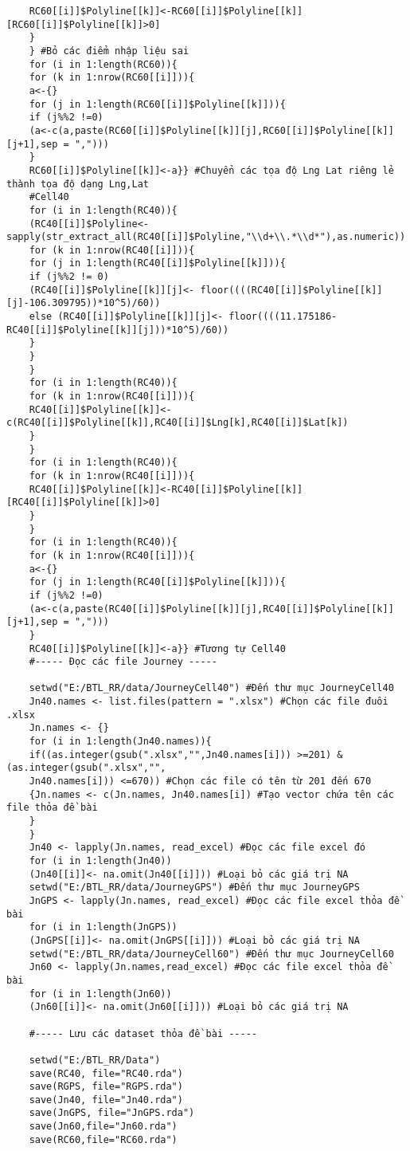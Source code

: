 \documentclass[a4paper]{article}
\begin{document}
\begin{verbatim}
	RC60[[i]]$Polyline[[k]]<-RC60[[i]]$Polyline[[k]][RC60[[i]]$Polyline[[k]]>0]
	}
	} #Bỏ các điểm nhập liệu sai
	for (i in 1:length(RC60)){
	for (k in 1:nrow(RC60[[i]])){
	a<-{}
	for (j in 1:length(RC60[[i]]$Polyline[[k]])){
	if (j%%2 !=0)
	(a<-c(a,paste(RC60[[i]]$Polyline[[k]][j],RC60[[i]]$Polyline[[k]][j+1],sep = ",")))
	}
	RC60[[i]]$Polyline[[k]]<-a}} #Chuyển các tọa độ Lng Lat riêng lẻ thành tọa độ dạng Lng,Lat
	#Cell40
	for (i in 1:length(RC40)){
	(RC40[[i]]$Polyline<-sapply(str_extract_all(RC40[[i]]$Polyline,"\\d+\\.*\\d*"),as.numeric))
	for (k in 1:nrow(RC40[[i]])){
	for (j in 1:length(RC40[[i]]$Polyline[[k]])){
	if (j%%2 != 0)
	(RC40[[i]]$Polyline[[k]][j]<- floor((((RC40[[i]]$Polyline[[k]][j]-106.309795))*10^5)/60))
	else (RC40[[i]]$Polyline[[k]][j]<- floor((((11.175186-RC40[[i]]$Polyline[[k]][j]))*10^5)/60))
	}
	}
	}
	for (i in 1:length(RC40)){
	for (k in 1:nrow(RC40[[i]])){
	RC40[[i]]$Polyline[[k]]<-c(RC40[[i]]$Polyline[[k]],RC40[[i]]$Lng[k],RC40[[i]]$Lat[k])
	}
	}
	for (i in 1:length(RC40)){
	for (k in 1:nrow(RC40[[i]])){
	RC40[[i]]$Polyline[[k]]<-RC40[[i]]$Polyline[[k]][RC40[[i]]$Polyline[[k]]>0]
	}
	}
	for (i in 1:length(RC40)){
	for (k in 1:nrow(RC40[[i]])){
	a<-{}
	for (j in 1:length(RC40[[i]]$Polyline[[k]])){
	if (j%%2 !=0)
	(a<-c(a,paste(RC40[[i]]$Polyline[[k]][j],RC40[[i]]$Polyline[[k]][j+1],sep = ",")))
	}
	RC40[[i]]$Polyline[[k]]<-a}} #Tương tự Cell40
	#----- Đọc các file Journey -----
	
	setwd("E:/BTL_RR/data/JourneyCell40") #Đến thư mục JourneyCell40
	Jn40.names <- list.files(pattern = ".xlsx") #Chọn các file đuôi .xlsx
	Jn.names <- {}
	for (i in 1:length(Jn40.names)){
	if((as.integer(gsub(".xlsx","",Jn40.names[i])) >=201) & (as.integer(gsub(".xlsx","",
	Jn40.names[i])) <=670)) #Chọn các file có tên từ 201 đến 670
	{Jn.names <- c(Jn.names, Jn40.names[i]) #Tạo vector chứa tên các file thỏa đề bài
	}
	}
	Jn40 <- lapply(Jn.names, read_excel) #Đọc các file excel đó
	for (i in 1:length(Jn40))
	(Jn40[[i]]<- na.omit(Jn40[[i]])) #Loại bỏ các giá trị NA
	setwd("E:/BTL_RR/data/JourneyGPS") #Đến thư mục JourneyGPS
	JnGPS <- lapply(Jn.names, read_excel) #Đọc các file excel thỏa đề bài
	for (i in 1:length(JnGPS))
	(JnGPS[[i]]<- na.omit(JnGPS[[i]])) #Loại bỏ các giá trị NA
	setwd("E:/BTL_RR/data/JourneyCell60") #Đến thư mục JourneyCell60
	Jn60 <- lapply(Jn.names,read_excel) #Đọc các file excel thỏa đề bài
	for (i in 1:length(Jn60))
	(Jn60[[i]]<- na.omit(Jn60[[i]])) #Loại bỏ các giá trị NA
	
	#----- Lưu các dataset thỏa đề bài -----
	
	setwd("E:/BTL_RR/Data")
	save(RC40, file="RC40.rda")
	save(RGPS, file="RGPS.rda")
	save(Jn40, file="Jn40.rda")
	save(JnGPS, file="JnGPS.rda")
	save(Jn60,file="Jn60.rda")
	save(RC60,file="RC60.rda")
	\end{verbatim}
\end{document}
